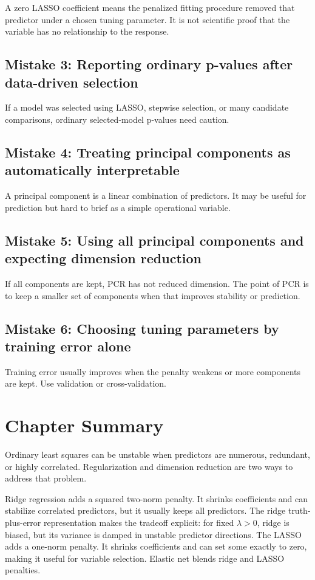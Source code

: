 A zero LASSO coefficient means the penalized fitting procedure removed that predictor under a chosen tuning parameter.  It is not scientific proof that the variable has no relationship to the response.

\subsection*{Mistake 3: Reporting ordinary p-values after data-driven selection}

If a model was selected using LASSO, stepwise selection, or many candidate comparisons, ordinary selected-model p-values need caution.

\subsection*{Mistake 4: Treating principal components as automatically interpretable}

A principal component is a linear combination of predictors.  It may be useful for prediction but hard to brief as a simple operational variable.

\subsection*{Mistake 5: Using all principal components and expecting dimension reduction}

If all components are kept, PCR has not reduced dimension.  The point of PCR is to keep a smaller set of components when that improves stability or prediction.

\subsection*{Mistake 6: Choosing tuning parameters by training error alone}

Training error usually improves when the penalty weakens or more components are kept.  Use validation or cross-validation.

\section{Chapter Summary}

Ordinary least squares can be unstable when predictors are numerous, redundant, or highly correlated.  Regularization and dimension reduction are two ways to address that problem.

Ridge regression adds a squared two-norm penalty.  It shrinks coefficients and can stabilize correlated predictors, but it usually keeps all predictors.  The ridge truth-plus-error representation makes the tradeoff explicit: for fixed \(\lambda>0\), ridge is biased, but its variance is damped in unstable predictor directions.  The LASSO adds a one-norm penalty.  It shrinks coefficients and can set some exactly to zero, making it useful for variable selection.  Elastic net blends ridge and LASSO penalties.

